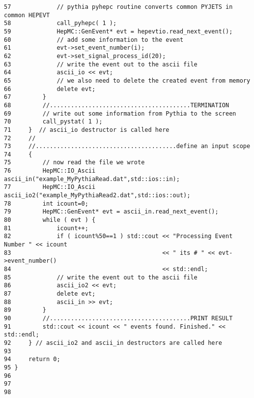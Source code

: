 \begin{DocInclude}
\begin{verbatim}
57             // pythia pyhepc routine converts common PYJETS in common HEPEVT
58             call_pyhepc( 1 );
59             HepMC::GenEvent* evt = hepevtio.read_next_event();
60             // add some information to the event
61             evt->set_event_number(i);
62             evt->set_signal_process_id(20);
63             // write the event out to the ascii file
64             ascii_io << evt;
65             // we also need to delete the created event from memory
66             delete evt;
67         }
68         //........................................TERMINATION
69         // write out some information from Pythia to the screen
70         call_pystat( 1 );    
71     }  // ascii_io destructor is called here
72     //
73     //........................................define an input scope
74     {
75         // now read the file we wrote
76         HepMC::IO_Ascii ascii_in("example_MyPythiaRead.dat",std::ios::in);
77         HepMC::IO_Ascii ascii_io2("example_MyPythiaRead2.dat",std::ios::out);
78         int icount=0;
79         HepMC::GenEvent* evt = ascii_in.read_next_event();
80         while ( evt ) {
81             icount++;
82             if ( icount%50==1 ) std::cout << "Processing Event Number " << icount
83                                           << " its # " << evt->event_number() 
84                                           << std::endl;
85             // write the event out to the ascii file
86             ascii_io2 << evt;
87             delete evt;
88             ascii_in >> evt;
89         }
90         //........................................PRINT RESULT
91         std::cout << icount << " events found. Finished." << std::endl;
92     } // ascii_io2 and ascii_in destructors are called here
93 
94     return 0;
95 }
96 
97 
98  
\end{verbatim}
\end{DocInclude}
 